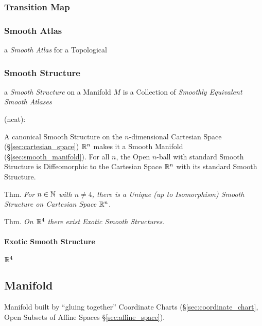 \subsubsection{Transition Map}\label{sec:transition_map}

\subsubsection{Smooth Atlas}\label{sec:smooth_atlas}

a \emph{Smooth Atlas} for a Topological



\subsubsection{Smooth Structure}\label{sec:smooth_structure}

a \emph{Smooth Structure} on a Manifold $M$ is a Collection of \emph{Smoothly
  Equivalent Smooth Atlases}

(ncat):

A canonical Smooth Structure on the $n$-dimensional Cartesian Space
(\S\ref{sec:cartesian_space}) $\mathbb{R}^n$ makes it a Smooth Manifold
(\S\ref{sec:smooth_manifold}). For all $n$, the Open $n$-ball with standard
Smooth Structure is Diffeomorphic to the Cartesian Space $\mathbb{R}^n$ with its
standard Smooth Structure.

Thm. \emph{For $n \in \mathbb{N}$ with $n \neq 4$, there is a Unique (up to
  Isomorphism) Smooth Structure on Cartesian Space $\mathbb{R}^n$}.

Thm. \emph{On $\mathbb{R}^4$ there exist Exotic Smooth Structures}.



\paragraph{Exotic Smooth Structure}\label{sec:exotic_smooth_structure}\hfill

$\mathbb{R}^4$



\subsection{Manifold}\label{sec:manifold}

Manifold built by ``gluing together'' Coordinate Charts
(\S\ref{sec:coordinate_chart}, Open Subsets of Affine Spaces
\S\ref{sec:affine_space}).

